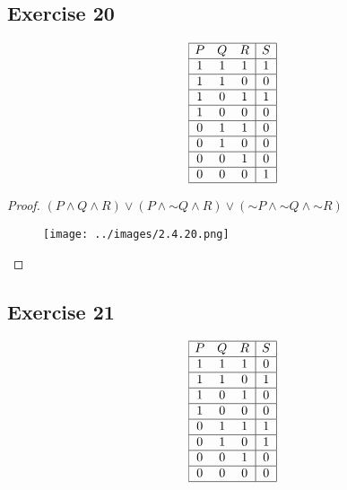 \documentclass[14pt]{extarticle}
\begin{document}
\subsection{Exercise 20}
$$
    \begin{array}{|ccc|c|}
        \hline
        P & Q & R & S \\
        \hline
        1 & 1 & 1 & 1 \\
        \hline
        1 & 1 & 0 & 0 \\
        \hline
        1 & 0 & 1 & 1 \\
        \hline
        1 & 0 & 0 & 0 \\
        \hline
        0 & 1 & 1 & 0 \\
        \hline
        0 & 1 & 0 & 0 \\
        \hline
        0 & 0 & 1 & 0 \\
        \hline
        0 & 0 & 0 & 1 \\
        \hline
    \end{array}
$$

\begin{proof}
    $(P \wedge Q \wedge R) \vee (P \wedge {\sim Q} \wedge R) \vee
        ({\sim P} \wedge {\sim Q} \wedge {\sim R})$

    \begin{figure}[ht!]
        \centering
        \texttt{[image: ../images/2.4.20.png]}
    \end{figure}
\end{proof}

\subsection{Exercise 21}
$$
    \begin{array}{|ccc|c|}
        \hline
        P & Q & R & S \\
        \hline
        1 & 1 & 1 & 0 \\
        \hline
        1 & 1 & 0 & 1 \\
        \hline
        1 & 0 & 1 & 0 \\
        \hline
        1 & 0 & 0 & 0 \\
        \hline
        0 & 1 & 1 & 1 \\
        \hline
        0 & 1 & 0 & 1 \\
        \hline
        0 & 0 & 1 & 0 \\
        \hline
        0 & 0 & 0 & 0 \\
        \hline
    \end{array}
$$
\end{document}
